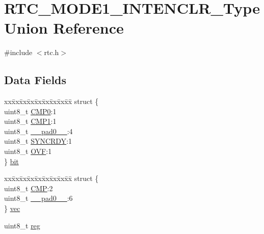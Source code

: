 \hypertarget{union_r_t_c___m_o_d_e1___i_n_t_e_n_c_l_r___type}{}\section{R\+T\+C\+\_\+\+M\+O\+D\+E1\+\_\+\+I\+N\+T\+E\+N\+C\+L\+R\+\_\+\+Type Union Reference}
\label{union_r_t_c___m_o_d_e1___i_n_t_e_n_c_l_r___type}


{\ttfamily \#include $<$rtc.\+h$>$}

\subsection*{Data Fields}
\begin{DoxyCompactItemize}
\item 
\begin{tabbing}
xx\=xx\=xx\=xx\=xx\=xx\=xx\=xx\=xx\=\kill
struct \{\\
\>uint8\_t \mbox{\hyperlink{union_r_t_c___m_o_d_e1___i_n_t_e_n_c_l_r___type_adc7d4e5f43b2e44a828fdfc89f126899}{CMP0}}:1\\
\>uint8\_t \mbox{\hyperlink{union_r_t_c___m_o_d_e1___i_n_t_e_n_c_l_r___type_af3bf2ba7b194836fad69c7dcac0bc7bb}{CMP1}}:1\\
\>uint8\_t \mbox{\hyperlink{union_r_t_c___m_o_d_e1___i_n_t_e_n_c_l_r___type_a8b4eebe79ded0459acec2f4950102ba3}{\_\_pad0\_\_}}:4\\
\>uint8\_t \mbox{\hyperlink{union_r_t_c___m_o_d_e1___i_n_t_e_n_c_l_r___type_aece75e176e4fd55bf68937f1b56bde63}{SYNCRDY}}:1\\
\>uint8\_t \mbox{\hyperlink{union_r_t_c___m_o_d_e1___i_n_t_e_n_c_l_r___type_ac6a3a2f132415ccc7b2b360497b74b15}{OVF}}:1\\
\} \mbox{\hyperlink{union_r_t_c___m_o_d_e1___i_n_t_e_n_c_l_r___type_a72a71280a17bdfef6613aa5edd1684a6}{bit}}\\

\end{tabbing}\item 
\begin{tabbing}
xx\=xx\=xx\=xx\=xx\=xx\=xx\=xx\=xx\=\kill
struct \{\\
\>uint8\_t \mbox{\hyperlink{union_r_t_c___m_o_d_e1___i_n_t_e_n_c_l_r___type_ac5a98d851fe96017f1c4624476deb57a}{CMP}}:2\\
\>uint8\_t \mbox{\hyperlink{union_r_t_c___m_o_d_e1___i_n_t_e_n_c_l_r___type_a8b4eebe79ded0459acec2f4950102ba3}{\_\_pad0\_\_}}:6\\
\} \mbox{\hyperlink{union_r_t_c___m_o_d_e1___i_n_t_e_n_c_l_r___type_ab3be936ce0db4a1e87c079053de83727}{vec}}\\

\end{tabbing}\item 
uint8\+\_\+t \mbox{\hyperlink{union_r_t_c___m_o_d_e1___i_n_t_e_n_c_l_r___type_a9428adc9af4653a2050e2536b55dec8d}{reg}}
\end{DoxyCompactItemize}


